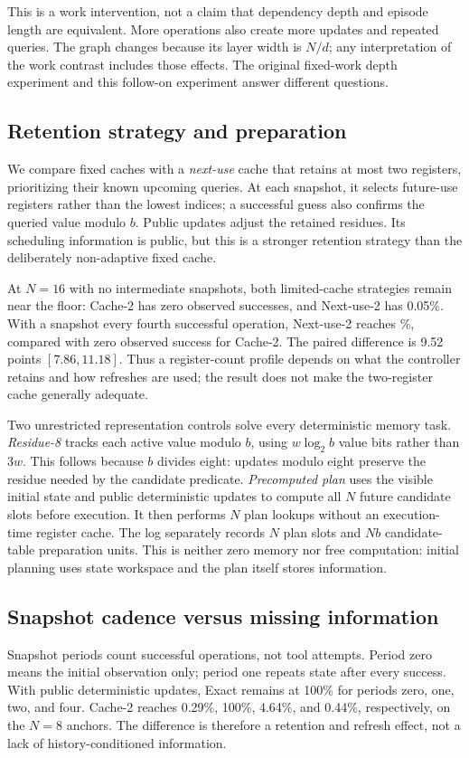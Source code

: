 \documentclass[sigconf,nonacm]{acmart}
\begin{document}
This is a work intervention, not a claim that dependency depth and episode
length are equivalent. More operations also create more updates and repeated
queries. The graph changes because its layer width is $N/d$; any
interpretation of the work contrast includes those effects.
The original fixed-work depth experiment and this follow-on experiment
answer different questions.

\subsection{Retention strategy and preparation}
We compare fixed caches with a \emph{next-use} cache that retains at most
two registers, prioritizing their known upcoming queries. At each snapshot,
it selects future-use registers rather than the lowest indices; a successful
guess also confirms the queried value modulo $b$. Public updates adjust the
retained residues. Its scheduling information is public, but this is a
stronger retention strategy than the deliberately non-adaptive fixed cache.

At $N=16$ with no intermediate snapshots, both limited-cache strategies
remain near the floor: Cache-2 has zero observed successes, and Next-use-2
has 0.05\%. With a snapshot every fourth successful operation,
Next-use-2 reaches \AdaptiveRefreshSuccess{}\%, compared with zero observed
success for Cache-2. The paired difference is 9.52 points
$[7.86,11.18]$. Thus a register-count profile depends on what the
controller retains and how refreshes are used; the result does not make
the two-register cache generally adequate.

Two unrestricted representation controls solve every deterministic memory
task. \emph{Residue-8} tracks each active value modulo $b$, using
$w\log_2 b$ value bits rather than $3w$. This follows because $b$ divides
eight: updates modulo eight preserve the residue needed by the candidate
predicate. \emph{Precomputed plan} uses the visible initial state and
public deterministic updates to compute all $N$ future candidate slots
before execution. It then performs $N$ plan lookups without an execution-time
register cache. The log separately records $N$ plan slots and $Nb$
candidate-table preparation units. This is neither zero memory nor free
computation: initial planning uses state workspace and the plan itself
stores information.

\subsection{Snapshot cadence versus missing information}
Snapshot periods count successful operations, not tool attempts.
Period zero means the initial observation only; period one repeats state
after every success. With public deterministic updates, Exact remains at
100\% for periods zero, one, two, and four. Cache-2 reaches 0.29\%,
100\%, 4.64\%, and 0.44\%, respectively, on the $N=8$ anchors.
The difference is therefore a retention and refresh effect, not a lack
of history-conditioned information.
\end{document}
